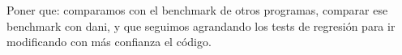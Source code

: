 Poner que: comparamos con el benchmark de otros programas, comparar ese benchmark con dani, y que seguimos agrandando los tests de regresión para ir modificando con más confianza el código.